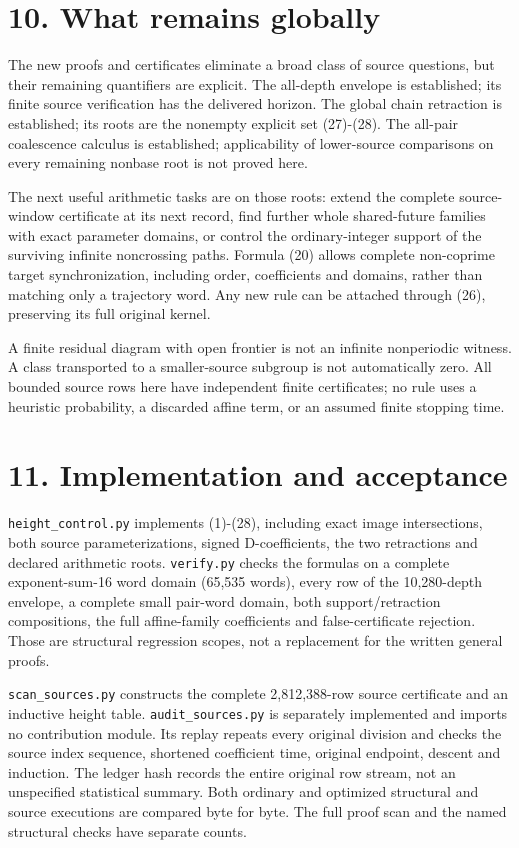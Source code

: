 \section{10. What remains globally}

The new proofs and certificates eliminate a broad class of source
questions, but their remaining quantifiers are explicit. The all-depth
envelope is established; its finite source verification has the
delivered horizon. The global chain retraction is established; its roots
are the nonempty explicit set (27)-(28). The all-pair coalescence
calculus is established; applicability of lower-source comparisons on
every remaining nonbase root is not proved here.

The next useful arithmetic tasks are on those roots: extend the complete
source-window certificate at its next record, find further whole
shared-future families with exact parameter domains, or control the
ordinary-integer support of the surviving infinite noncrossing paths.
Formula (20) allows complete non-coprime target synchronization,
including order, coefficients and domains, rather than matching only a
trajectory word. Any new rule can be attached through (26), preserving
its full original kernel.

A finite residual diagram with open frontier is not an infinite
nonperiodic witness. A class transported to a smaller-source subgroup is
not automatically zero. All bounded source rows here have independent
finite certificates; no rule uses a heuristic probability, a discarded
affine term, or an assumed finite stopping time.

\section{11. Implementation and acceptance}

\nolinkurl{height_control.py} implements (1)-(28), including exact image
intersections, both source parameterizations, signed D-coefficients, the
two retractions and declared arithmetic roots. \nolinkurl{verify.py}
checks the formulas on a complete exponent-sum-16 word domain (65,535
words), every row of the 10,280-depth envelope, a complete small
pair-word domain, both support/retraction compositions, the full
affine-family coefficients and false-certificate rejection. Those are
structural regression scopes, not a replacement for the written general
proofs.

\nolinkurl{scan_sources.py} constructs the complete 2,812,388-row source
certificate and an inductive height table. \nolinkurl{audit_sources.py}
is separately implemented and imports no contribution module. Its replay
repeats every original division and checks the source index sequence,
shortened coefficient time, original endpoint, descent and induction.
The ledger hash records the entire original row stream, not an
unspecified statistical summary. Both ordinary and optimized structural
and source executions are compared byte for byte. The full proof scan
and the named structural checks have separate counts.

